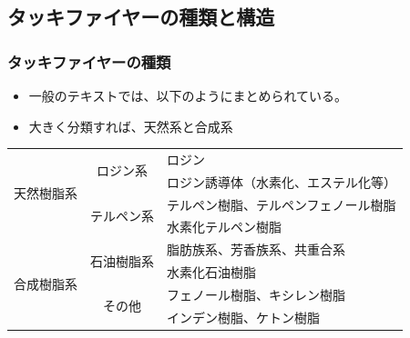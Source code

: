 \documentclass[12pt, dvipdfmx]{beamer}
\begin{document}
\subsection{タッキファイヤーの種類と構造}
\begin{frame}
	\frametitle{タッキファイヤーの種類}
		\begin{itemize}
			\item 一般のテキストでは、以下のようにまとめられている。
			\item 大きく分類すれば、天然系と合成系
		\end{itemize}
	\begin{table}[tb]
		\scriptsize
		\centering
			\begin{tabular}{ccl}
				\toprule
				\multirow{4}{*}{天然樹脂系}	&\multirow{2}{*}{ロジン系}&ロジン \\
											&	&ロジン誘導体（水素化、エステル化等） \\
											\cmidrule(lr){2-3}
											&\multirow{2}{*}{テルペン系}& テルペン樹脂、テルペンフェノール樹脂\\ 
											& & 水素化テルペン樹脂 \\
				\midrule
				\multirow{4}{*}{合成樹脂系} &\multirow{2}{*}{石油樹脂系}& 脂肪族系、芳香族系、共重合系 \\ 
											&	& 水素化石油樹脂 \\
											\cmidrule(lr){2-3}
											&\multirow{2}{*}{その他}& フェノール樹脂、キシレン樹脂 \\
											&	&インデン樹脂、ケトン樹脂\\ 
				\bottomrule
			\end{tabular}
	\end{table}
	
	
\end{frame}
\end{document}

